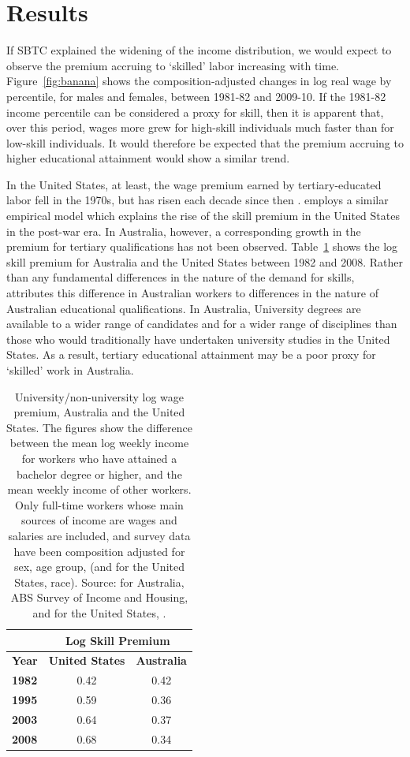 \section{Results}

If SBTC explained the widening of the income distribution, we would expect to observe the premium accruing to `skilled' labor increasing with time. Figure~\ref{fig:banana} shows the composition-adjusted changes in log real wage by percentile, for males and females, between 1981-82 and 2009-10. If the 1981-82 income percentile can be considered a proxy for skill, then it is apparent that, over this period, wages more grew for high-skill individuals much faster than for low-skill individuals. It would therefore be expected that the premium accruing to higher educational attainment would show a similar trend.

In the United States, at least, the wage premium earned by tertiary-educated labor fell in the 1970s, but has risen each decade since then \citep{Acemoglu2011}. \citet{Katz1992} employs a similar empirical model which explains the rise of the skill premium in the United States in the post-war era. In Australia, however, a corresponding growth in the premium for tertiary qualifications has not been observed. Table~\ref{tbl:wagepremium} shows the log skill premium for Australia and the United States between 1982 and 2008. Rather than any fundamental differences in the nature of the demand for skills, \citet{Coelli2009} attributes this difference in Australian workers to differences in the nature of Australian educational qualifications. In Australia, University degrees are available to a wider range of candidates and for a wider range of disciplines than those who would traditionally have undertaken university studies in the United States. As a result, tertiary educational attainment may be a poor proxy for `skilled' work in Australia.
\begin{table}
  \centering
  \begin{tabular}{lcc}
  \hline
           & \multicolumn{2}{c}{\bf Log Skill Premium} \\
\hline
{\bf Year} &	{\bf United States} & {\bf Australia} \\
{\bf 1982} &	0.42 &	0.42 \\
{\bf 1995} &	0.59 &	0.36 \\
{\bf 2003} &	0.64 &	0.37 \\
{\bf 2008} &	0.68 &	0.34 \\ \hline
\end{tabular}
  \caption{University/non-university log wage premium, Australia and the United States. The figures show the difference between the mean log weekly income for workers who have attained a bachelor degree or higher, and the mean weekly income of other workers. Only full-time workers whose main sources of income are wages and salaries are included, and survey data have been composition adjusted for sex, age group, (and for the United States, race). Source: for Australia, ABS Survey of Income and Housing, and for the United States, \citet{Acemoglu2011}.}
  \label{tbl:wagepremium}
\end{table}

